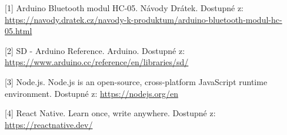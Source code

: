 \begin{flushleft}
\label{dratek}[1] Arduino Bluetooth modul HC-05. Návody Drátek. Dostupné z: \url{https://navody.dratek.cz/navody-k-produktum/arduino-bluetooth-modul-hc-05.html}
\end{flushleft}

\begin{flushleft}
\label{arduinoSD}[2] SD - Arduino Reference. Arduino. Dostupné z: \url{https://www.arduino.cc/reference/en/libraries/sd/}
\end{flushleft}

\begin{flushleft}
\label{nodejs}[3] Node.js. Node.js\textsuperscript{\textregistered} is an open-source, cross-platform JavaScript runtime environment. Dostupné z: \url{https://nodejs.org/en}
\end{flushleft}

\begin{flushleft}
\label{reactnative}[4] React Native. Learn once, write anywhere. Dostupné z: \url{https://reactnative.dev/}
\end{flushleft}


